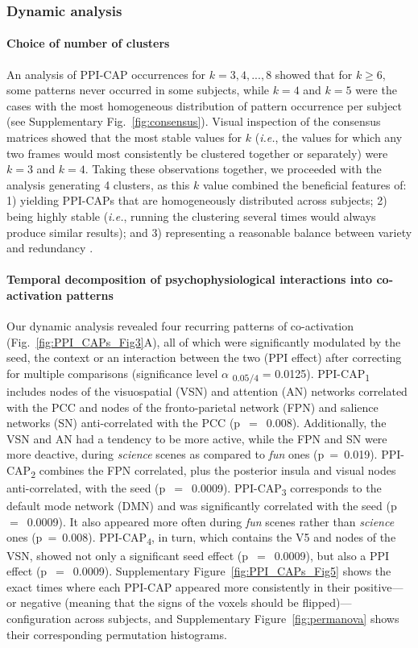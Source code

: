 \subsubsection{Dynamic analysis} 

\paragraph{Choice of number of clusters} An analysis of PPI-CAP occurrences for  $k={3,4,...,8}$ showed that for $k\geq 6$, some patterns never occurred in some subjects, while $k=4$ and $k=5$ were the cases with the most homogeneous distribution of pattern occurrence per subject (see Supplementary Fig.~\ref{fig:consensus}). Visual inspection of the consensus matrices showed that the most stable values for $k$ (\textit{i.e.}, the values for which any two frames would most consistently be clustered together or separately) were $k=3$ and $k=4$. Taking these observations together, we proceeded with the analysis generating 4 clusters, as this $k$ value combined the beneficial features of: 1) yielding PPI-CAPs that are homogeneously distributed across subjects; 2) being highly stable (\textit{i.e.}, running the clustering several times would always produce similar results); and 3) representing a reasonable balance between variety and redundancy \citep{Liu2013}.



\paragraph{Temporal decomposition of psychophysiological interactions into co-activation patterns} Our dynamic analysis revealed four recurring patterns of co-activation (Fig.~\ref{fig:PPI_CAPs_Fig3}A), all of which were significantly modulated by the seed, the context or an interaction between the two (PPI effect) after correcting for multiple comparisons (significance level $\alpha$ \textsubscript{$0.05/4$} = 0.0125). 
PPI-CAP\textsubscript{1} includes nodes of the visuospatial (VSN) and attention (AN) networks correlated with the PCC and nodes of the fronto-parietal network (FPN) and salience networks (SN) anti-correlated with the PCC (p~$=$~0.008). Additionally, the VSN and AN had a tendency to be more active, while the FPN and SN were more deactive,  during \textit{science} scenes as compared to \textit{fun} ones (p~=~0.019). PPI-CAP\textsubscript{2} combines the FPN correlated, plus the posterior insula and visual nodes anti-correlated, with the seed (p~$=$~0.0009). PPI-CAP\textsubscript{3} corresponds to the default mode network (DMN) and was significantly correlated with the seed (p~$=$~0.0009). It also appeared more often during \textit{fun} scenes rather than \textit{science} ones (p~=~0.008). PPI-CAP\textsubscript{4}, in turn, which contains the V5 and nodes of the VSN, showed not only a significant seed effect (p~$=$~0.0009), but also a PPI effect (p~$=$~0.0009).  Supplementary Figure~\ref{fig:PPI_CAPs_Fig5} shows the exact times where each PPI-CAP appeared more consistently in their positive---or negative (meaning that the signs of the voxels should be flipped)---configuration across subjects, and  Supplementary Figure~\ref{fig:permanova} shows their corresponding permutation histograms. 


